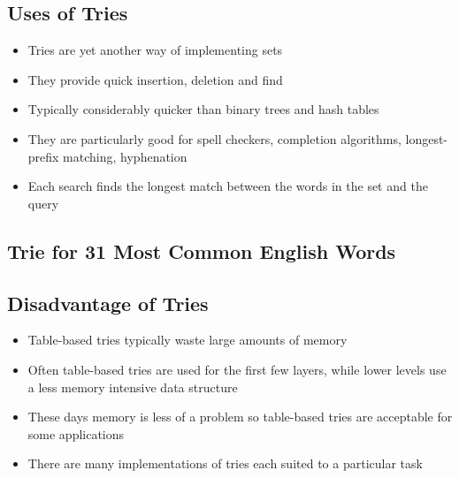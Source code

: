 \begin{slide}
\section{Uses of Tries}

\begin{PauseHighLight}
  \begin{itemize}
  \item Tries are yet another way of implementing sets\pause
  \item They provide quick insertion, deletion and find\pause
  \item Typically considerably quicker than binary trees and hash
    tables\pause
  \item They are particularly good for spell checkers, completion
    algorithms, longest-prefix matching, hyphenation\pause
  \item Each search finds the longest match between the words in the set
    and the query\pause
  \end{itemize}
\end{PauseHighLight}

\end{slide}


\begin{slide}
\section[-2]{Trie for 31 Most Common English Words}
\pause
\pb
{}
\begin{center}
  \pause
\end{center}
\end{slide}


\begin{slide}
\section{Disadvantage of Tries}

\begin{PauseHighLight}
  \begin{itemize}
  \item Table-based tries typically waste large amounts of memory\pause
  \item Often table-based tries are used for the first few layers, while
    lower levels use a less memory intensive data structure\pause
  \item These days memory is less of a problem so table-based tries are
    acceptable for some applications\pause
  \item There are many implementations of tries each suited to a
    particular task\pause
  \end{itemize}
\end{PauseHighLight}

\end{slide}

